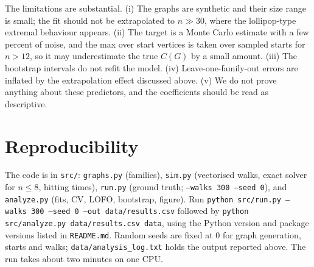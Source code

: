 \documentclass{article}
\begin{document}
The limitations are substantial. (i) The graphs are synthetic and their size range is small; the fit should not be extrapolated to $n\gg 30$, where the lollipop-type extremal behaviour appears. (ii) The target is a Monte Carlo estimate with a few percent of noise, and the max over start vertices is taken over sampled starts for $n>12$, so it may underestimate the true $C(G)$ by a small amount. (iii) The bootstrap intervals do not refit the model. (iv) Leave-one-family-out errors are inflated by the extrapolation effect discussed above. (v) We do not prove anything about these predictors, and the coefficients should be read as descriptive.

\section{Reproducibility}
\label{sec:repro}
The code is in \texttt{src/}: \texttt{graphs.py} (families), \texttt{sim.py} (vectorised walks, exact solver for $n\le 8$, hitting times), \texttt{run.py} (ground truth; \texttt{--walks 300 --seed 0}), and \texttt{analyze.py} (fits, CV, LOFO, bootstrap, figure). Run \texttt{python src/run.py --walks 300 --seed 0 --out data/results.csv} followed by \texttt{python src/analyze.py data/results.csv data}, using the Python version and package versions listed in \texttt{README.md}. Random seeds are fixed at 0 for graph generation, starts and walks; \texttt{data/analysis\_log.txt} holds the output reported above. The run takes about two minutes on one CPU.





\end{document}
